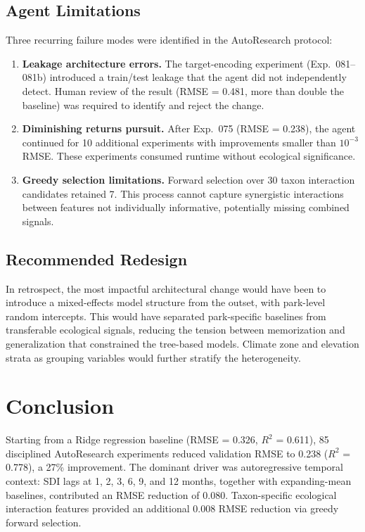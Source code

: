 \documentclass{article}
\begin{document}
\subsection{Agent Limitations}

Three recurring failure modes were identified in the AutoResearch
protocol:

\begin{enumerate}
  \item \textbf{Leakage architecture errors.} The target-encoding
    experiment (Exp.\ 081--081b) introduced a train/test leakage
    that the agent did not independently detect. Human review of the
    result (RMSE = 0.481, more than double the baseline) was required
    to identify and reject the change.
  \item \textbf{Diminishing returns pursuit.} After Exp.\ 075
    (RMSE = 0.238), the agent continued for 10 additional experiments
    with improvements smaller than $10^{-3}$ RMSE. These experiments
    consumed runtime without ecological significance.
  \item \textbf{Greedy selection limitations.} Forward selection over
    30 taxon interaction candidates retained 7. This process cannot
    capture synergistic interactions between features not individually
    informative, potentially missing combined signals.
\end{enumerate}

\subsection{Recommended Redesign}

In retrospect, the most impactful architectural change would have been
to introduce a mixed-effects model structure from the outset, with
park-level random intercepts. This would have separated park-specific
baselines from transferable ecological signals, reducing the tension
between memorization and generalization that constrained the tree-based
models. Climate zone and elevation strata as grouping variables would
further stratify the heterogeneity.

\section{Conclusion}
\label{sec:conclusion}

Starting from a Ridge regression baseline (RMSE = 0.326, $R^{2}$ =
0.611), 85 disciplined AutoResearch experiments reduced validation RMSE
to 0.238 ($R^{2}$ = 0.778), a 27\% improvement. The dominant driver
was autoregressive temporal context: SDI lags at 1, 2, 3, 6, 9, and
12 months, together with expanding-mean baselines, contributed an RMSE
reduction of 0.080. Taxon-specific ecological interaction features
provided an additional 0.008 RMSE reduction via greedy forward
selection.
\end{document}
